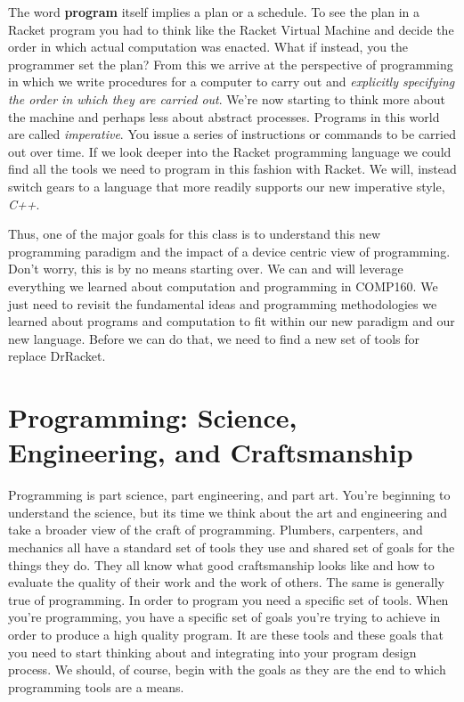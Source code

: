 \documentclass[]{tufte-handout}
\begin{document}
The word \textbf{program} itself implies a plan or a schedule. To see the plan in a Racket program you had to think like the Racket Virtual Machine and decide the order in which actual computation was enacted. What if instead, you the programmer set the plan? From this we arrive at the perspective of programming in which we write procedures for a computer to carry out and \textit{explicitly specifying the order in which they are carried out}.  We're now starting to think more about the machine and perhaps less  about abstract processes.  Programs in this world are called \textit{imperative}.  You issue a series of instructions or commands to be carried out over time.  If we look deeper into the Racket programming language we could find all the tools we need to program in this fashion with Racket.  We will, instead switch gears to a language that more readily supports our new imperative style, \textit{C++}. 

Thus, one of the major goals for this class is to understand this new programming paradigm and the impact of a device centric view of programming. Don't worry, this is by no means starting over.  We can and will leverage everything we learned about computation and programming in COMP160. We just need to revisit the fundamental ideas and programming methodologies we learned about programs and computation to fit within our new paradigm and our new language. Before we can do that, we need to find a new set of tools for replace DrRacket.


\section{Programming: Science, Engineering, and Craftsmanship}

Programming is part science, part engineering, and part art.  You're beginning to understand the science, but its time we think about the art and engineering and take a broader view of the craft of programming.  Plumbers, carpenters, and mechanics all have a standard set of tools they use and shared set of goals for the things they do.  They all know what good craftsmanship looks like and how to evaluate the quality of their work and the work of others. The same is generally true of programming. In order to program you need a specific set of tools. When you're programming, you have a specific set of goals you're trying to achieve in order to produce a high quality program. It are these tools and these goals that you need to start thinking about and integrating into your program design process.  We should, of course, begin with the goals as they are the end to which programming tools are a means.  
\end{document}
